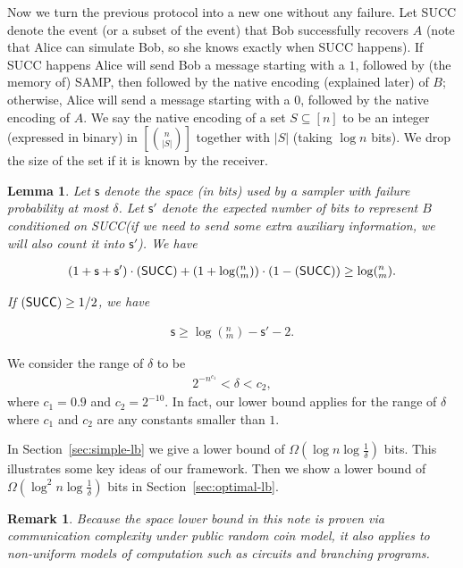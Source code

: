 \documentclass[10pt]{article}
\newtheorem{lemma}{Lemma}
\newtheorem{remark}{Remark}
\let\Pr\relax
\DeclareMathOperator*{\Pr}{\mathbb{P}}
\newcommand{\samp}{\textsf{SAMP}\xspace}
\newcommand{\success}{\textsf{SUCC}\xspace}
\newcommand{\s}{\textsf{s}\xspace}
\begin{document}
Now we turn the previous protocol into a new one without any failure. Let \success denote the event (or a subset of the event) that Bob successfully recovers $A$ (note that Alice can simulate Bob, so she knows exactly when \success happens). If \success happens Alice will send Bob a message starting with a $1$, followed by (the memory of) \samp, then followed by the native encoding (explained later) of $B$; otherwise, Alice will send a message starting with a $0$, followed by the native encoding of $A$. We say the native encoding of a set $S\subseteq [n]$ to be an integer (expressed in binary) in $[{n \choose |S|}]$ together with $|S|$ (taking $\log n$ bits). We drop the size of the set if it is known by the receiver.

\begin{lemma} \label{lemma:lb-meta}
  Let $\s$ denote the space (in bits) used by a sampler with failure probability at most $\delta$. Let $\s'$ denote the expected number of bits to represent $B$ conditioned on \success (if we need to send some extra auxiliary information, we will also count it into $\s'$). We have 
  
  \begin{align}
  (1+\s+\s')\cdot \Pr(\success)+(1+\log (^n_m)) \cdot (1-\Pr(\success)) \ge \log (^n_m).
  \end{align} 
  
  If $\Pr(\success)\ge 1/2$, we have 
  
  \begin{align} \label{formula:lb-meta}
  \s\ge \log (^n_m) - \s' - 2.
  \end{align} 
\end{lemma}

We consider the range of $\delta$ to be 
\begin{align} \label{formula:delta-range}
2^{-n^{c_1}}<\delta<c_2,
\end{align}
where $c_1=0.9$ and $c_2=2^{-10}$. In fact, our lower bound applies for the range of $\delta$ where $c_1$ and $c_2$ are any constants smaller than $1$. 

In Section~\ref{sec:simple-lb} we give a lower bound of $\Omega(\log n \log \frac{1}{\delta})$ bits. This illustrates some key ideas of our framework. Then we show a lower bound of $\Omega(\log^2 n \log \frac{1}{\delta})$ bits in Section~\ref{sec:optimal-lb}.

\begin{remark}
  Because the space lower bound in this note is proven via communication complexity under public random coin model, it also applies to non-uniform models of computation such as circuits and branching programs.  
\end{remark}
\end{document}

